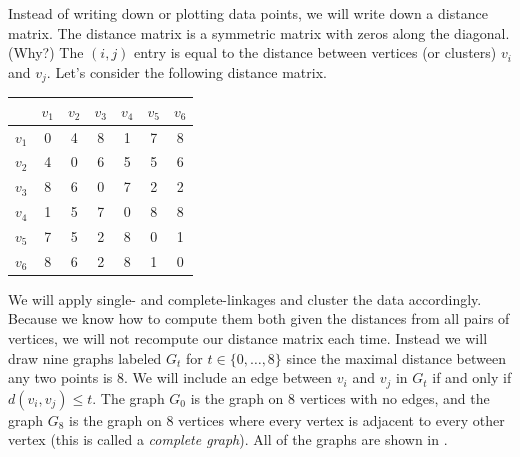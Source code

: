 \documentclass[a4paper, 12pt]{article}
\numberwithin{equation}{section}
\numberwithin{figure}{section}
\theoremstyle{definition}
\renewcommand{\leq}{\leqslant}
\begin{document}
Instead of writing down or plotting data points, we will write down a distance
matrix. The distance matrix is a symmetric matrix with zeros along the diagonal.
(Why?) The $(i,j)$ entry is equal to the distance between vertices (or clusters)
$v_i$ and $v_j$. Let's consider the following distance matrix.
\begin{center}
	\begin{tabular}{c|cccccc}
		& $v_1$ & $v_2$ & $v_3$ & $v_4$ & $v_5$ & $v_6$ \\ \hline 
		$v_1$ & 0 & 4 & 8 & 1 & 7 & 8 \\
		$v_2$ & 4 & 0 & 6 & 5 & 5 & 6 \\
		$v_3$ & 8 & 6 & 0 & 7 & 2 & 2 \\
		$v_4$ & 1 & 5 & 7 & 0 & 8 & 8 \\
		$v_5$ & 7 & 5 & 2 & 8 & 0 & 1 \\
		$v_6$ & 8 & 6 & 2 & 8 & 1 & 0 
	\end{tabular}
\end{center}

We will apply single- and complete-linkages and cluster the data accordingly.
Because we know how to compute them both given the distances from all pairs of
vertices, we will not recompute our distance matrix each time. Instead we will
draw nine graphs labeled $G_t$ for $t\in \{0, \dots, 8\}$ since the maximal
distance between any two points is $8$. We will include an edge between $v_i$
and $v_j$ in $G_t$ if and only if $d(v_i, v_j)\leq t$. The graph $G_0$ is the
graph on 8 vertices with no edges, and the graph $G_8$ is the graph on 8
vertices where every vertex is adjacent to every other vertex (this is called a
\emph{complete graph}). All of the graphs are shown in .
\end{document}
